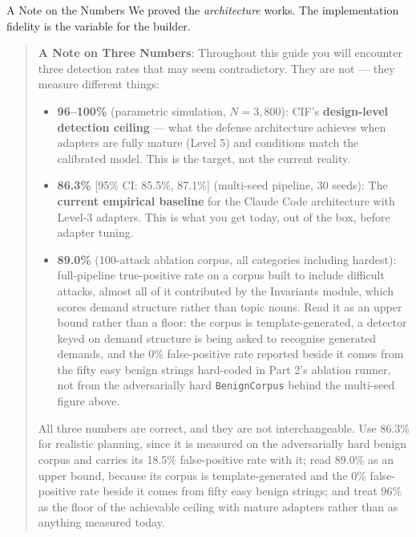 \documentclass[
  ignorenonframetext,
]{beamer}
\providecommand{\tightlist}{%
  \setlength{\itemsep}{0pt}\setlength{\parskip}{0pt}}
\begin{document}
\begin{frame}{A Note on the Numbers}
We proved the \emph{architecture} works. The implementation fidelity is
the variable for the builder.

\begin{quote}
\textbf{A Note on Three Numbers}: Throughout this guide you will
encounter three detection rates that may seem contradictory. They are
not --- they measure different things:

\begin{itemize}
\tightlist
\item
  \textbf{96--100\%} (parametric simulation, \(N=3{,}800\)): CIF's
  \textbf{design-level detection ceiling} --- what the defense
  architecture achieves when adapters are fully mature (Level 5) and
  conditions match the calibrated model. This is the target, not the
  current reality.
\item
  \textbf{86.3\%} {[}95\% CI: 85.5\%, 87.1\%{]} (multi-seed pipeline, 30
  seeds): The \textbf{current empirical baseline} for the Claude Code
  architecture with Level-3 adapters. This is what you get today, out of
  the box, before adapter tuning.
\item
  \textbf{89.0\%} (100-attack ablation corpus, all categories including
  hardest): full-pipeline true-positive rate on a corpus built to
  include difficult attacks, almost all of it contributed by the
  Invariants module, which scores demand structure rather than topic
  nouns. Read it as an upper bound rather than a floor: the corpus is
  template-generated, a detector keyed on demand structure is being
  asked to recognise generated demands, and the 0\% false-positive rate
  reported beside it comes from the fifty easy benign strings hard-coded
  in Part 2's ablation runner, not from the adversarially hard
  \texttt{BenignCorpus} behind the multi-seed figure above.
\end{itemize}

All three numbers are correct, and they are not interchangeable. Use
86.3\% for realistic planning, since it is measured on the adversarially
hard benign corpus and carries its 18.5\% false-positive rate with it;
read 89.0\% as an upper bound, because its corpus is template-generated
and the 0\% false-positive rate beside it comes from fifty easy benign
strings; and treat 96\% as the floor of the achievable ceiling with
mature adapters rather than as anything measured today.
\end{quote}
\end{frame}
\end{document}
